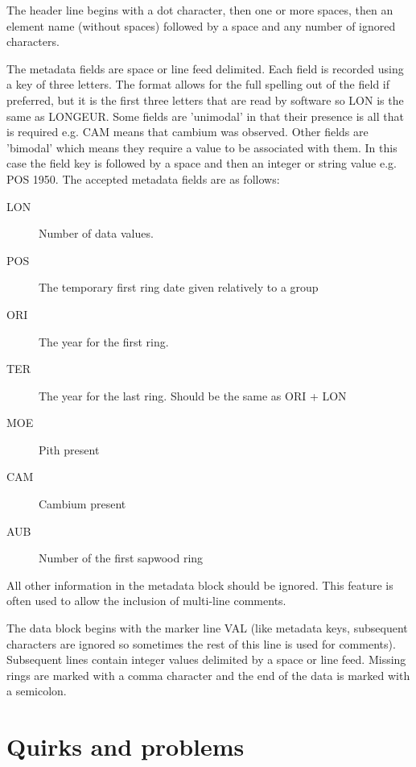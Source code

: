\documentclass[10pt, headsepline,DIV14,BCOR0.5cm]{scrreprt}
\begin{document}
\begin{itemize*}
    \item The header line begins with a dot character, then one or more spaces, then an element name (without spaces) followed by a space and any number of ignored characters.
    \item The metadata fields are space or line feed delimited. Each field is recorded using a key of three letters. The format allows for the full spelling out of the field if preferred, but it is the first three letters that are read by software so LON is the same as LONGEUR. Some fields are 'unimodal' in that their presence is all that is required e.g. CAM means that cambium was observed. Other fields are 'bimodal' which means they require a value to be associated with them. In this case the field key is followed by a space and then an integer or string value e.g. POS 1950. The accepted metadata fields are as follows:
    \begin{description}
          \item[LON] Number of data values.
          \item[POS] The temporary first ring date given relatively to a group
          \item[ORI] The year for the first ring.
          \item[TER] The year for the last ring. Should be the same as ORI + LON
          \item[MOE] Pith present
          \item[CAM] Cambium present
          \item[AUB] Number of the first sapwood ring 
    \end{description}   
    All other information in the metadata block should be ignored. This feature is often used to allow the inclusion of multi-line comments. 
    \item The data block begins with the marker line VAL (like metadata keys, subsequent characters are ignored so sometimes the rest of this line is used for comments). Subsequent lines contain integer values delimited by a space or line feed. Missing rings are marked with a comma character and the end of the data is marked with a semicolon. 
\end{itemize*}

\section{Quirks and problems}
\end{document}
